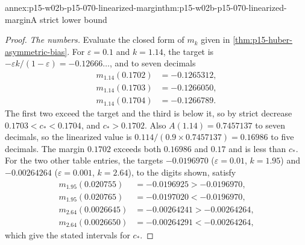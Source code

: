 \begin{annexitem}{annex:p15-w02b-p15-070-linearized-margin}{thm:p15-w02b-p15-070-linearized-margin}{A strict lower bound}
\begin{proof}
\emph{The numbers.} Evaluate the closed form of \(m_k\) given in
\cref{thm:p15-huber-asymmetric-bias}. For \(\varepsilon=0.1\) and
\(k=1.14\), the target is
\(-\varepsilon k/(1-\varepsilon)=-0.12666\ldots\), and to seven decimals
\[
\begin{aligned}
 m_{1.14}(0.1702)&=-0.1265312,\\
 m_{1.14}(0.1703)&=-0.1266050,\\
 m_{1.14}(0.1704)&=-0.1266789.
\end{aligned}
\]
The first two exceed the target and the third is below it, so by strict
decrease \(0.1703<c_*<0.1704\), and \(c_*>0.1702\). Also
\(A(1.14)=0.7457137\) to seven decimals, so the linearized value is
\(0.114/(0.9\times0.7457137)=0.16986\) to five decimals. The margin
\(0.1702\) exceeds both \(0.16986\) and \(0.17\) and is less than
\(c_*\). For the two other table entries, the targets
\(-0.0196970\) (\(\varepsilon=0.01\), \(k=1.95\)) and
\(-0.00264264\) (\(\varepsilon=0.001\), \(k=2.64\)), to the digits
shown, satisfy
\[
\begin{aligned}
 m_{1.95}(0.020755)&=-0.0196925>-0.0196970,\\
 m_{1.95}(0.020765)&=-0.0197020<-0.0196970,\\
 m_{2.64}(0.0026645)&=-0.00264241>-0.00264264,\\
 m_{2.64}(0.0026650)&=-0.00264291<-0.00264264,
\end{aligned}
\]
which give the stated intervals for \(c_*\).
\end{proof}
\end{annexitem}

